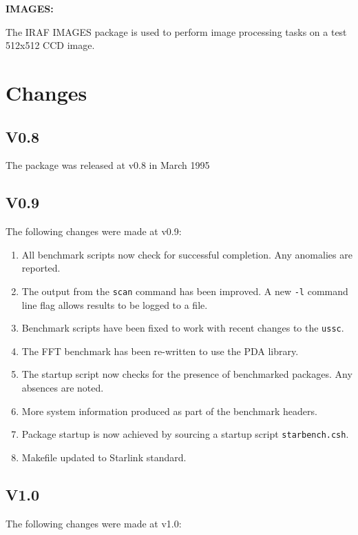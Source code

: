 {\bf IMAGES:}

The IRAF IMAGES package is used to perform image processing tasks on
a test 512x512 CCD image.

\section{Changes}

\subsection{V0.8}

The package was released at v0.8 in March 1995

\subsection{V0.9}

The following changes were made at v0.9:

\begin{enumerate}
\item All benchmark scripts now check for successful completion. Any anomalies
are reported.
\item The output from the {\tt scan} command has been improved. A new {\tt -l}
command line flag allows results to be logged to a file.
\item Benchmark scripts have been fixed to work with recent changes to the
{\tt ussc}.
\item The FFT benchmark has been re-written to use the PDA library.
\item The startup script now checks for the presence of benchmarked
packages. Any absences are noted.
\item More system information produced as part of the benchmark headers.
\item Package startup is now achieved by sourcing a startup script
{\tt starbench.csh}.
\item Makefile updated to Starlink standard.
\end{enumerate}

\subsection{V1.0}

The following changes were made at v1.0:

